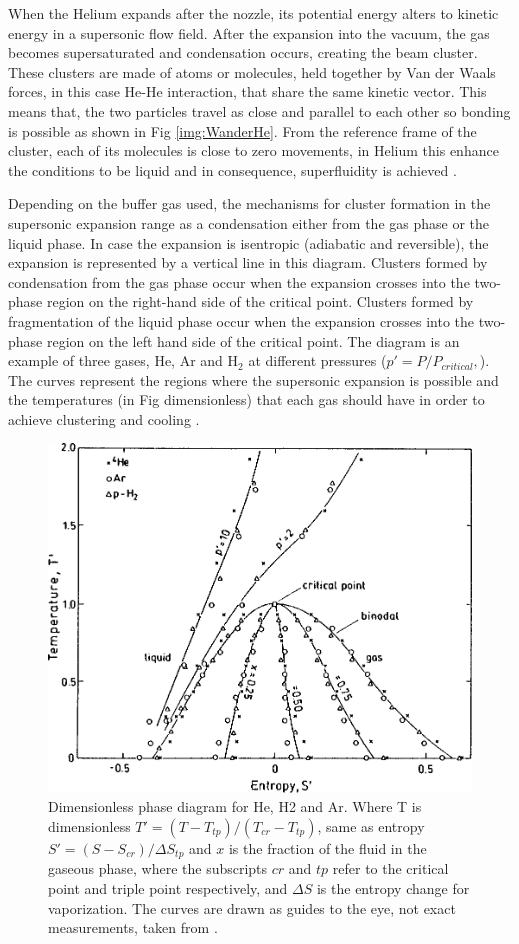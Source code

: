 When the Helium expands after the nozzle, its potential energy alters to kinetic energy  in a supersonic flow field. After the expansion into the vacuum, the gas becomes supersaturated and condensation occurs, creating the beam cluster. These clusters are made of atoms or molecules, held together by Van der Waals forces, in this case He-He interaction, that share the same kinetic vector. This means that, the two particles travel as close and parallel to each other so  bonding is possible as shown in Fig \ref{img:WanderHe}. From the reference frame of the cluster, each of its molecules is close to zero movements, in Helium this enhance the conditions to be liquid and in consequence, superfluidity is achieved \cite{hagena_cluster_1972}.
 

Depending on the buffer gas used, the mechanisms for cluster formation in the supersonic expansion range as a condensation either from the gas phase or the liquid phase. In case the expansion is isentropic (adiabatic and reversible), the expansion is represented by a vertical line in this diagram. Clusters formed by condensation from the gas phase occur when the expansion crosses into the two-phase region on the right-hand side of the critical point. Clusters formed by fragmentation of the liquid phase occur when the expansion crosses into the two-phase region on the left hand side of the critical point. The diagram is an example of three gases, He, Ar and H$_{2}$ at different pressures ($p'=P/P_{critical},$)\cite{knuth_average_1999}. The curves represent the regions where the supersonic expansion is possible and the temperatures (in Fig dimensionless) that each gas should have in order to achieve clustering and cooling \cite{knuth_average_1999}.

\begin{figure}[h!]
	\centering
	\includegraphics[width= 8 cm]{../Images/dimensiones isentropic diagram.png}
	\caption[helium isentropic diagram]{Dimensionless phase diagram for He, H2 and Ar. Where T is dimensionless $T'=(T -T_{tp})/(T_{cr}-T_{tp})$, same as entropy $S'=(S-S_{cr})/\Delta S_{tp}$ and $x$ is the fraction of the fluid in the gaseous phase, where the subscripts $cr$ and $tp$ refer to the critical point and triple point respectively, and $\Delta S$ is the entropy change for vaporization. The curves are drawn as guides to the eye, not exact measurements, taken from \cite{knuth_average_1999}.}
	\label{img:tsHe} 
\end{figure}
  

